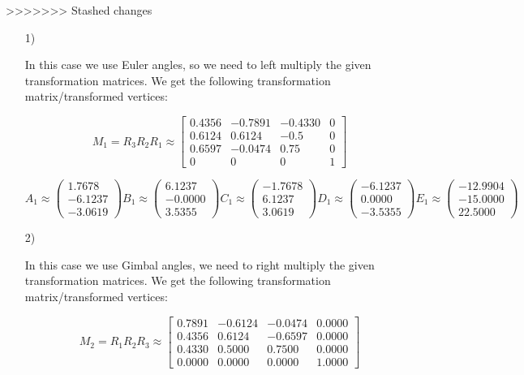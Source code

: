 \documentclass[a4paper,11pt]{article}
\begin{document}
\begin {enumerate}
>>>>>>> Stashed changes
    \begin{enumerate}
        \item[1)]

            In this case we use Euler angles, so we need to left multiply the
            given transformation matrices. We get the following transformation
            matrix/transformed vertices:

        $$M_1 = R_3 R_2 R_1 \approx \begin{bmatrix}
            0.4356 & -0.7891 & -0.4330 & 0 \\
            0.6124 &  0.6124 & -0.5 & 0 \\
            0.6597 & -0.0474 &  0.75 & 0 \\
            0 & 0 & 0 & 1
        \end{bmatrix}$$

        $$
            A_1 \approx \begin{pmatrix}1.7678 \\ -6.1237 \\ -3.0619\end{pmatrix}
            B_1 \approx \begin{pmatrix}6.1237 \\ -0.0000 \\ 3.5355\end{pmatrix}
            C_1 \approx \begin{pmatrix}-1.7678 \\ 6.1237 \\ 3.0619\end{pmatrix}
            D_1 \approx \begin{pmatrix}-6.1237 \\ 0.0000 \\ -3.5355\end{pmatrix}
            E_1 \approx \begin{pmatrix}-12.9904 \\ -15.0000 \\ 22.5000\end{pmatrix}
        $$


        \item[2)]

            In this case we use Gimbal angles, we need to right multiply the
            given transformation matrices. We get the following transformation
            matrix/transformed vertices:

        $$M_2 = R_1 R_2 R_3 \approx \begin{bmatrix}
            0.7891 & -0.6124 & -0.0474 & 0.0000\\
            0.4356 & 0.6124 & -0.6597 & 0.0000\\
            0.4330 & 0.5000 & 0.7500 & 0.0000\\
            0.0000 & 0.0000 & 0.0000 & 1.0000
        \end{bmatrix}$$


\end{enumerate}
\end{enumerate}
\end{document}
